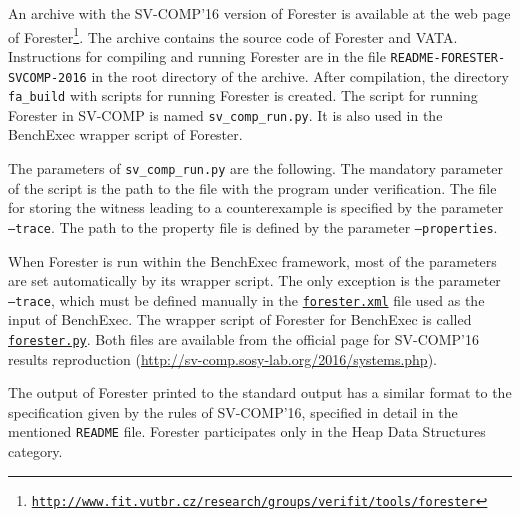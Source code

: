 An archive with the SV-COMP'16 version of Forester is available at the web page
of
Forester\footnote{\href{http://www.fit.vutbr.cz/research/groups/verifit/tools/forester}{\texttt{http://www.fit.vutbr.cz/research/groups/verifit/tools/forester}}}.
The archive contains the source code of Forester and VATA. Instructions for
compiling and running Forester are in the file
\texttt{README-FORESTER-SVCOMP-2016} in the root directory of the archive.
After compilation, the directory \texttt{fa\_build} with scripts for running
Forester is created. The script for running Forester in SV-COMP is named
\texttt{sv\_comp\_run.py}. It is also used in the BenchExec wrapper script of
Forester.

The parameters of \texttt{sv\_comp\_run.py} are the following. The mandatory
parameter of the script is the path to the file with the program under
verification. The file for storing the witness leading to a counterexample is
specified by the parameter \texttt{--trace}.
The path to the property file
is defined by the parameter \texttt{--properties}.

When Forester is run within the BenchExec framework, most of the parameters are set
automatically by its wrapper script. The only exception is the parameter
\texttt{--trace}, which must be defined manually in the
\href{https://github.com/sosy-lab/sv-comp/tree/svcomp16/benchmark-defs-2016/forester.xml}{\texttt{forester.xml}}
file used as the
input of BenchExec.
The wrapper script of Forester for BenchExec is called \href{https://github.com/sosy-lab/benchexec/tree/1.7/benchexec/tools/forester.py}{\texttt{forester.py}}.
Both files are available from the official page for SV-COMP'16 results reproduction (\url{http://sv-comp.sosy-lab.org/2016/systems.php}).

The output of Forester printed to the standard output has a similar format to
the specification given by the rules of SV-COMP'16,
specified in detail
in the mentioned \texttt{README} file.
%
Forester participates only in %
the Heap Data Structures category.

